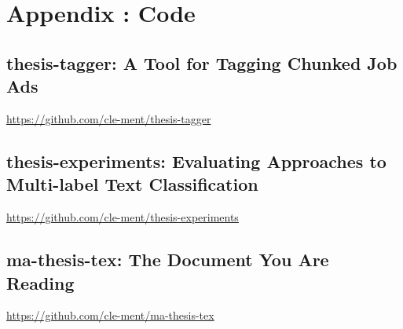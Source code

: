 \clearpage


% 
% 




\clearpage

\section{Appendix \label{B}: Code}

\subsection{thesis-tagger: A Tool for Tagging Chunked Job Ads}
\label{sub:thesis-tagger: A Tool for Tagging Chunked Job Ads}

\url{https://github.com/cle-ment/thesis-tagger}

\subsection{thesis-experiments: Evaluating Approaches to Multi-label Text Classification}
\label{sub:thesis-experiments: Evaluating Approaches to Multi-label Text Classification}


\url{https://github.com/cle-ment/thesis-experiments}

\subsection{ma-thesis-tex: The Document You Are Reading}
\label{sub:ma-thesis-tex: The Document You Are Reading}

\url{https://github.com/cle-ment/ma-thesis-tex}
